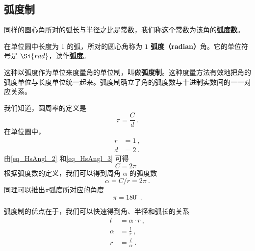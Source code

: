
\begin{issues}
\issueMissDepend
\end{issues}


\subsection{弧度制}
同样的圆心角所对的弧长与半径之比是常数，我们称这个常数为该角的\textbf{弧度数}。

在单位圆中长度为 $1$ 的弧，所对的圆心角称为 \textbf{$1$ 弧度（radian）}角。它的单位符号是 $\Si{rad}$，读作\textbf{弧度}。


这种以弧度作为单位来度量角的单位制，叫做\textbf{弧度制}。这种度量方法有效地把角的弧度单位与长度单位统一起来。弧度制确立了角的弧度数与十进制实数间的一一对应关系。

我们知道，圆周率的定义是
\begin{equation}\label{eq_HsAngl_2}
\pi = \frac{C}{d}~.
\end{equation}
在单位圆中，
\begin{equation}\label{eq_HsAngl_3}
\begin{aligned}
r &= 1~,\\
d &= 2~.
\end{aligned}
\end{equation}
由\autoref{eq_HsAngl_2} 和\autoref{eq_HsAngl_3} 可得
\begin{equation}
C = 2\pi~.
\end{equation}
根据弧度数的定义，我们可以得到周角 $\alpha$ 的弧度数
\begin{equation}
\alpha = C / r = 2\pi~.
\end{equation}
同理可以推出$\pi$弧度所对应的角度
\begin{equation}
\pi = 180^\circ~.
\end{equation}

弧度制的优点在于，我们可以快速得到角、半径和弧长的关系
\begin{equation}
\begin{aligned}
l &= \alpha \cdot r~, \\
\alpha &= \frac{l}{r}~, \\
r &= \frac{l}{\alpha}~.
\end{aligned}
\end{equation}

